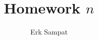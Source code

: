 

\title{Homework $n$}
\author{Erk Sampat}
\usepackage{lipsum} %

\maketitle
\prob
\lipsum[][1-2]

\lipsum[][1-2]
\begin{pp}
	\lipsum[][1-2]
	
	\lipsum[][1-2]
	\begin{spart}
		\lipsum[][1-2]
		
		\lipsum[][1-2]
	\end{spart}
\end{pp}
\begin{pp}
	\lipsum[][1-2]
	
	\lipsum[][1-2]
	\begin{spart}
		\lipsum[][1-2]
		
		\lipsum[][1-2]
	\end{spart}
	\begin{spart}
		\lipsum[][1-2]
		
		\lipsum[][1-2]
	\end{spart}
	\begin{spart}
		\lipsum[][1-2]
		
		\lipsum[][1-2]
	\end{spart}
	\begin{spart}
		\lipsum[][1-2]
		
		\lipsum[][1-2]
	\end{spart}
\end{pp}
